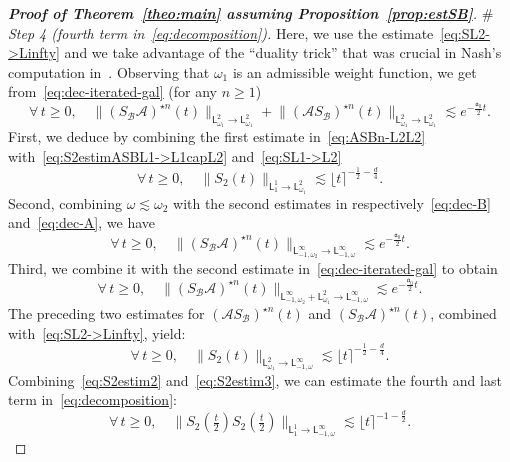 \documentclass[11pt]{amsart}
\theoremstyle{definition}
\theoremstyle{remark}
\numberwithin{equation}{section}
\def\AA{{\mathcal A}}
\def\BB{{\mathcal B}}
\newcommand{\sfL}{\mathsf{L}}
\newcommand{\wangle}[1]{\lfloor #1 \rceil}
\begin{document}
\begin{proof}[{\bf Proof of Theorem~\ref{theo:main} assuming Proposition~\ref{prop:estSB}}]
  \smallskip\noindent
  {\# \sl Step 4 (fourth term in~\eqref{eq:decomposition}).}
  Here, we use the estimate~\eqref{eq:SL2->Linfty} and we take advantage of the ``duality trick'' that was crucial in Nash's computation in~\cite{Nash}.
  Observing that $\omega_1$ is an admissible weight function, we get from~\eqref{eq:dec-iterated-gal} (for any $n \ge 1$)
  \begin{equation}
    \label{eq:ASBn-L2L2}
    \forall \, t \ge 0, \quad \big\| (S_\BB\AA )^{\star n} (t) \big\|_{\sfL^{2}_{\omega_1}  \to \sfL^{2}_{\omega_1}} + \big\| (\AA S_\BB)^{\star n} (t) \big\|_{\sfL^{2}_{\omega_1}  \to \sfL^{2}_{\omega_1}} \lesssim e^{- \frac{\mathfrak{a}_0}{2} t}.
  \end{equation}
  First, we deduce by combining the first estimate in~\eqref{eq:ASBn-L2L2} with~\eqref{eq:S2estimASBL1->L1capL2} and~\eqref{eq:SL1->L2}
  \begin{equation}
    \label{eq:S2estim2}
    \forall \, t \ge 0, \quad \big\| S_2 (t) \big\|_{\sfL^{1}_{1} \to \sfL^{2}_{\omega_1}} \lesssim \wangle{t}^{-\frac12-\frac{d}4}.
  \end{equation}
  Second, combining $\omega \lesssim \omega_2$ with the second estimates in respectively~\eqref{eq:dec-B} and~\eqref{eq:dec-A}, we have
  \begin{equation*}
    \forall \, t \ge 0, \quad \big\| (S_\BB \AA)^{\star n} (t) \big\|_{\sfL^{\infty}_{-1,\omega_2} \to \sfL^{\infty}_{-1,\omega}} \lesssim e^{- \frac{\mathfrak{a}_0}{2} t}.
  \end{equation*}
  Third, we combine it with the second estimate in~\eqref{eq:dec-iterated-gal} to obtain
  \begin{equation}
    \label{eq:SBAn-Linfty+L2Linfty}
    \forall \, t \ge 0, \quad \big\| (S_\BB\AA)^{\star n} (t) \big\|_{\sfL^{\infty}_{-1,\omega_2}  + \sfL^{2}_{\omega_1} \to  \sfL^{\infty}_{-1,\omega}} \lesssim e^{-\frac{\mathfrak{a}_0}{2}  t}.
  \end{equation}
  The preceding two estimates for $(\AA S_\BB)^{\star n} (t)$ and $(S_\BB \AA)^{\star n} (t)$, combined with~\eqref{eq:SL2->Linfty}, yield:
  \begin{equation}
    \label{eq:S2estim3}
    \forall \, t \ge 0, \quad \big\| S_2 (t) \big\|_{\sfL^{2}_{\omega_1} \to \sfL^{\infty}_{-1,\omega}} \lesssim \wangle{t}^{-\frac12-\frac{d}4}.
  \end{equation}
  Combining~\eqref{eq:S2estim2} and~\eqref{eq:S2estim3}, we can estimate the fourth and last term in~\eqref{eq:decomposition}:
  \begin{equation*}
    \forall \, t \ge 0, \quad \big\| S_2 \left(\tfrac{t}{2}\right) S_2 \left(\tfrac{t}{2}\right) \big\|_{\sfL^{1}_{1}  \to \sfL^{\infty}_{-1,\omega}} \lesssim \wangle{t}^{-1-\frac{d}2}.
  \end{equation*}
  

\end{proof}
\end{document}
